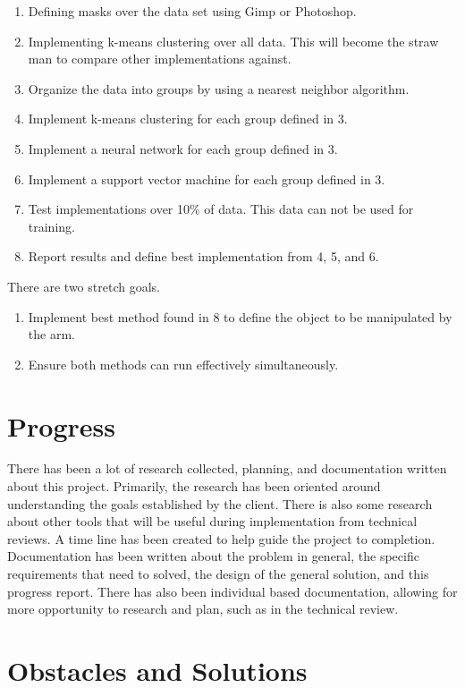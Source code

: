 \documentclass[10pt,journal,compsoc, draftclsnofoot,onecolumn]{IEEEtran}
\begin{document}
\begin{enumerate}
\item Defining masks over the data set using Gimp or Photoshop.
\item Implementing k-means clustering over all data. 
This will become the straw man to compare other implementations against.
\item Organize the data into groups by using a nearest neighbor algorithm.
\item Implement k-means clustering for each group defined in 3.
\item Implement a neural network for each group defined in 3.
\item Implement a support vector machine for each group defined in 3.
\item Test implementations over 10\% of data.
This data can not be used for training.
\item Report results and define best implementation from 4, 5, and 6.
\end{enumerate}

\noindent
There are two stretch goals.

\begin{enumerate}
\item Implement best method found in 8 to define the object to be manipulated by the arm.
\item Ensure both methods can run effectively simultaneously.
\end{enumerate}


\section{Progress}

There has been a lot of research collected, planning, and documentation written about this project.
Primarily, the research has been oriented around understanding the goals established by the client.
There is also some research about other tools that will be useful during implementation from technical reviews.
A time line has been created to help guide the project to completion.
Documentation has been written about the problem in general, the specific requirements that need to solved, the design of the general solution, and this progress report.
There has also been individual based documentation, allowing for more opportunity to research and plan, such as in the technical review.


\section{Obstacles and Solutions}
\end{document}

